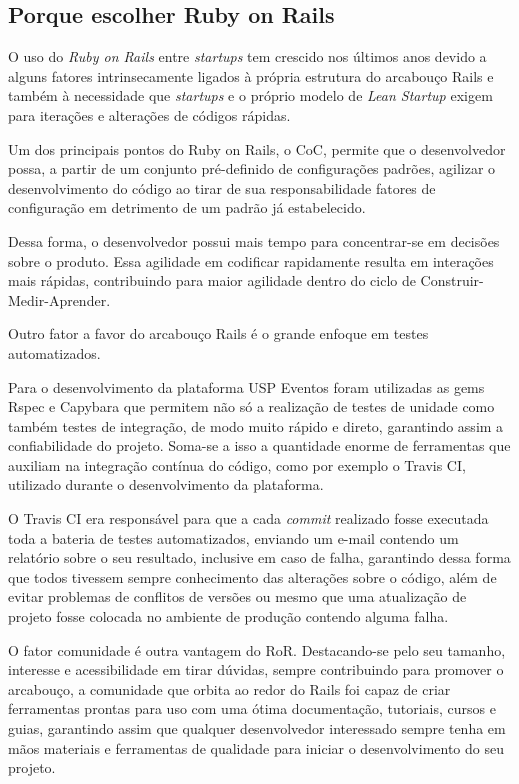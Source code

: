 \subsection{Porque escolher Ruby on Rails }
\par O uso do \emph{Ruby on Rails} entre \emph{startups} tem crescido nos últimos anos devido a alguns fatores intrinsecamente ligados à própria estrutura do arcabouço Rails e também à necessidade que \emph{startups} e o próprio modelo de \emph{Lean Startup} exigem para iterações e alterações de códigos rápidas. \citep{lilia:16}
\par Um dos principais pontos do Ruby on Rails, o CoC, permite que o desenvolvedor possa, a partir de um conjunto pré-definido de configurações padrões, agilizar o desenvolvimento do código ao tirar de sua responsabilidade fatores de configuração em detrimento de um padrão já estabelecido. \citep{morrice:15}
\par Dessa forma, o desenvolvedor possui mais tempo para concentrar-se em decisões sobre o produto. Essa agilidade em codificar rapidamente resulta em interações mais rápidas, contribuindo para maior agilidade dentro do ciclo de Construir-Medir-Aprender.
\par Outro fator a favor do arcabouço Rails é o grande enfoque em testes automatizados. \citep{morrice:15}
\par Para o desenvolvimento da plataforma USP Eventos foram utilizadas as gems Rspec e Capybara que permitem não só a realização de testes de unidade como também testes de integração, de modo muito rápido e direto, garantindo assim a confiabilidade do projeto. Soma-se a isso a quantidade enorme de ferramentas que auxiliam na integração contínua do código, como por exemplo o Travis CI, utilizado durante o desenvolvimento da plataforma.
\par O Travis CI era responsável para que a cada \emph{commit} realizado fosse executada toda a bateria de testes automatizados, enviando um e-mail contendo um relatório sobre o seu resultado, inclusive em caso de falha, garantindo dessa forma que todos tivessem sempre conhecimento das alterações sobre o código, além de evitar problemas de conflitos de versões ou mesmo que uma atualização de projeto fosse colocada no ambiente de produção contendo alguma falha.
\par O fator comunidade é outra vantagem do RoR. Destacando-se pelo seu tamanho, interesse e acessibilidade em tirar dúvidas, sempre contribuindo para promover o arcabouço, a comunidade que orbita ao redor do Rails foi capaz de criar ferramentas prontas para uso com uma ótima documentação, tutoriais, cursos e guias, garantindo assim que qualquer desenvolvedor interessado sempre tenha em mãos materiais e ferramentas de qualidade para iniciar o desenvolvimento do seu projeto. \citep{lilia:16}
